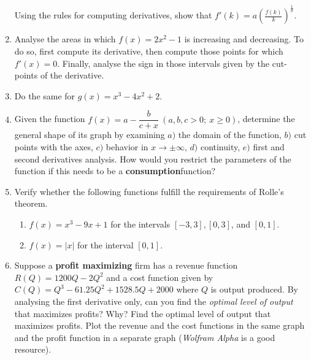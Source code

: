 \documentclass[11pt]{article}
\theoremstyle{definition}
\theoremstyle{plain}
\begin{document}
\begin{enumerate}
Using the rules for computing derivatives, show that
\(f'(k) = a\left(\frac{f(k)}{k}\right)^{\frac{1}{\sigma}}\).

\item Analyse the areas in which \(f(x) = 2x^2 - 1\) is
increasing and decreasing. To do so, first compute its derivative, then
compute those points for which \(f'(x) = 0\). Finally, analyse the sign
in those intervals given by the cut-points of the derivative.

\item Do the same for \(g(x) = x^3-4x^2+2\).

\item Given the function \(\displaystyle f(x) = a - \dfrac{b}{c + x} \: (a,b,c > 0; \: x \geq 0)\), determine the general shape of its graph by examining \(a)\) the domain of the function, \(b)\) cut points with the axes, \(c)\) behavior in \(x\rightarrow \pm \infty\), \(d)\) continuity, \(e)\) first and second derivatives analysis. How would you restrict the parameters of the function if this needs to be a \textbf{consumption}function?

\item Verify whether the following functions fulfill the requirements of Rolle's theorem.

    \begin{enumerate}[label = (\alph*)]
        \item \(f(x) = x^3 - 9x + 1\) for the intervals \([-3,3],[0, 3]\), and \([0, 1]\).
        \item \(f(x) = \lvert x \rvert\) for the interval \([0, 1]\).
    \end{enumerate}

\item Suppose a \textbf{profit maximizing} firm has a revenue function \(R(Q) = 1200 Q - 2Q^2\) and a cost function given by \(C(Q) = Q^3 - 61.25Q^2 + 1528.5Q + 2000\) where \(Q\) is output produced. By analysing the first derivative only, can you find the \emph{optimal level of output} that maximizes profits? Why? Find the optimal level of output that maximizes profits. Plot the revenue and the cost functions in the same graph and the profit function in a separate graph (\emph{Wolfram Alpha} is a good resource).
\end{enumerate}
\end{document}
